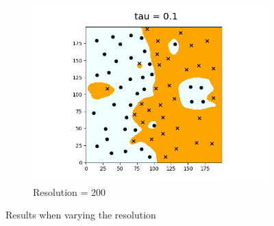 \documentclass{article}
\begin{document}
\begin{figure}[h]
\begin{subfigure}{0.3\textwidth}
      \centering
      \includegraphics[width=\linewidth]{res_200_tau_0point1}
      \caption{Resolution = 200}
      \label{fig:subfig3}
    \end{subfigure}
  
    \caption{Results when varying the resolution}
    \label{fig:overall}
\end{figure}
\end{document}
